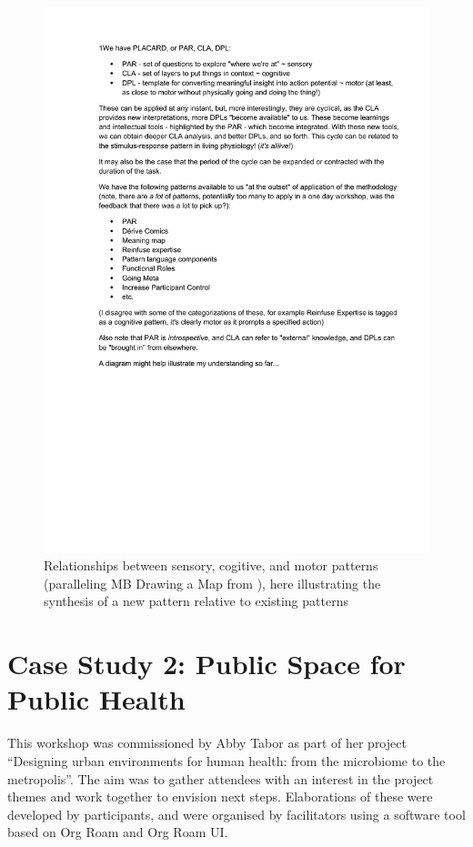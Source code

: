 \documentclass[acmlarge,timestamp]{acmart}
\DeclareRobustCommand{\scitshape}{\fontshape{\scitdefault}\selectfont}
\begin{document}
\begin{figure}[h!]
  \includegraphics[width=.8\textwidth,page=3,trim={2cm 8.5cm 1.6cm 2cm},clip=true]{alex_thoughts}
  \caption{Relationships between sensory, cogitive, and motor patterns (paralleling {\scitshape MB Drawing a Map} from \citet{iba2016pattern}), here illustrating the synthesis of a new pattern relative to existing patterns\label{alex-diagram}}
\end{figure}

\clearpage

\section{Case Study 2: Public Space for Public Health}\label{second-case-study}

This workshop was commissioned by Abby Tabor as part of her project
“Designing urban environments for human health: from the microbiome to
the metropolis”.  The aim was to gather attendees with an interest in
the project themes and work together to envision next
steps. Elaborations of these were developed by participants, and were
organised by facilitators using a software tool based on Org Roam and
Org Roam UI.
\end{document}
